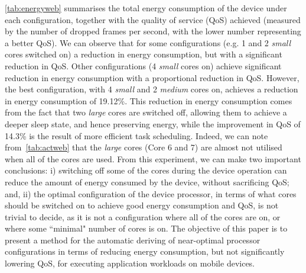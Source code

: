 \documentclass[conference]{IEEEtran}
\begin{document}
\cref{tab:energyweb} summarises the total energy consumption of the device under each configuration, together with the quality of service (QoS) achieved (measured by the number of dropped frames per second, with the lower number representing a better QoS). We can observe that for some configurations (e.g. 1 and 2 \emph{small} cores switched on) a reduction in energy consumption, but with a significant reduction in QoS. Other configurations (4 \emph{small} cores on) achieve significant reduction in energy consumption with a proportional reduction in QoS. However, the best configuration, with 4 \emph{small} and 2 \emph{medium} cores on, achieves a reduction in energy consumption of 19.12\%. This reduction in energy consumption comes from the fact that two \emph{large} cores are switched off, allowing them to achieve a deeper sleep state, and hence preserving energy, while the improvement in QoS of 14.3\% is the result of more efficient task scheduling. Indeed, we can note from~\cref{tab:actweb} that the \emph{large} cores (Core 6 and 7) are almost not utilised when all of the cores are used. From this experiment, we can make two important conclusions: i) switching off some of the cores during the device operation can reduce the amount of energy consumed by the device, without sacrificing QoS; and, ii) the optimal configuration of the device processor, in terms of what cores should be switched on to achieve good energy consumption and QoS, is not trivial to decide, as it is not a configuration where all of the cores are on, or where some ``minimal" number of cores is on. The objective of this paper is to present a method for the automatic deriving of near-optimal processor configurations in terms of reducing energy consumption, but not significantly lowering QoS, for executing application workloads on mobile devices.

      
\end{document}
